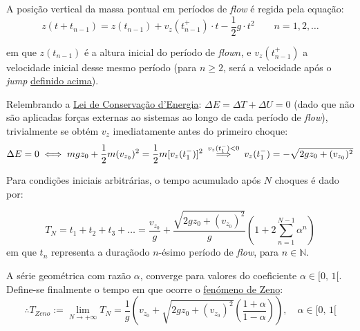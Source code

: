
\vspace{1em}
\noindent A posição vertical da massa pontual em períodos de \textit{flow} é regida pela equação:
\vspace{-0.5em}
$$
    z(t + t_{n-1}) = z(t_{n-1}) + v_{z}(t_{n-1}^+) \cdot t - \frac{1}{2}g \cdot t^2\qquad n = 1, 2, \dots
$$

\vspace{-0.5em}
\noindent em que $z(t_{n-1})$ é a altura inicial do período de \textit{flow}\footnotemark[4] $n$, e $v_{z}(t_{n-1}^+)$ a velocidade inicial desse mesmo período (para $n \ge 2$, será a velocidade após o \textit{jump} \hyperref[sec:intro]{definido acima}).


Relembrando a \underline{Lei de Conservação d'Energia}: $\Delta E = \Delta T + \Delta U = 0$ (dado que não são aplicadas forças externas ao sistemas ao longo de cada período de \textit{flow}), trivialmente se obtém $v_{z}$ imediatamente antes do primeiro choque:
\vspace{-0.5em}
$$
    \Delta E = 0 \iff mg z_0 + \frac{1}{2}m (v_{z_0})^2 = \frac{1}{2}m [v_{z}(t_{1}^-)]^2 \:\testeimpliess\: v_z(t_{1}^-) = -\sqrt{2 g z_0 + (v_{z_0})^2}
$$

\vspace{-0.5em}
\noindent Para condições iniciais arbitrárias, o tempo acumulado após $N$ choques é dado por:

\vspace{-0.5em}
$$
    T_N = t_1 + t_2 + t_3 + \dots = \frac{v_{z_0}}{g} +  \frac{\sqrt{2 g z_0 + (v_{z_0})^2}}{g} \left(1 + 2 \sum\limits_{n=1}^{N-1} \alpha^n \right)
$$
em que $t_n$ representa a duração\footnotemark[5] do $n$-ésimo período de \textit{flow}, para $n \in \mathbb{N}$.

A série geométrica com razão $\alpha$, converge para valores do coeficiente $\alpha \in [0,\,1[$. Define-se finalmente o tempo em que ocorre o \hyperref[def:zeno]{fenómeno de Zeno}\footnotemark[9]\footnotemark[10]:
\vspace{-0.5em}
$$
    \therefore T_{Zeno} := \lim\limits_{N \to +\infty} T_N = \frac{1}{g} \left(v_{z_0} + \sqrt{2 g z_0 + (v_{z_0})^2} \left(\frac{1+\alpha}{1-\alpha}\right)\right),\quad \alpha \in [0,\,1[
$$


